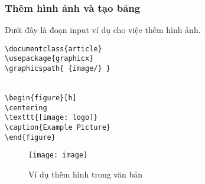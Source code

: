 \subsubsection*{Thêm hình ảnh và tạo bảng}
Dưới đây là đoạn input ví dụ cho việc thêm hình ảnh.\par
\begin{verbatim}
\documentclass{article}
\usepackage{graphicx}
\graphicspath{ {image/} }


\begin{figure}[h]
\centering
\texttt{[image: logo]}
\caption{Example Picture}
\end{figure}

\end{verbatim}
\begin{figure}[H]
 \centering
 \texttt{[image: image]}
 \caption{Ví dụ thêm hình trong văn bản}
 \label{fig:image}
\end{figure}

